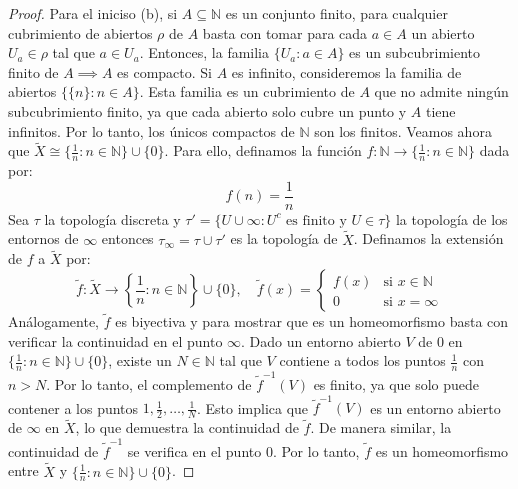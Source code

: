 \documentclass{article}
\theoremstyle{plain}
\theoremstyle{definition}
\newcommand{\N}{\mathbb{N}}
\begin{document}
\begin{proof}
    Para el iniciso (b), si \( A \subseteq \N \) es un conjunto finito, para cualquier cubrimiento de abiertos \( \rho \) de \( A \) basta con tomar
    para cada \( a \in A \) un abierto \( U_a \in \rho \) tal que \( a \in U_a \). Entonces, la familia \( \{ U_a : a \in A \} \) es un
    subcubrimiento finito de \( A \implies A \) es compacto. Si \( A \) es infinito, consideremos la familia de abiertos \( \{ \{ n \} : n \in A \} \).
    Esta familia es un cubrimiento de \( A \) que no admite ningún subcubrimiento finito, ya que cada abierto solo cubre un punto y \( A \) tiene infinitos.
    Por lo tanto, los únicos compactos de \( \N \) son los finitos. Veamos ahora que \( \tilde{X} \cong \{ \frac{1}{n} : n \in \N \} \cup \{ 0 \} \).
    Para ello, definamos la función \( f : \N \to \{ \frac{1}{n} : n \in \N \} \) dada por:\[
        f(n) = \frac{1}{n}
    \]
    Sea \( \tau \) la topología discreta y \( \tau' = \{ U \cup \infty : U^c \text{ es finito y } U \in \tau \} \) la topología de los entornos de \( \infty \)
    entonces \( \tau_\infty = \tau \cup \tau' \) es la topología de \( \tilde{X} \). Definamos la extensión de \( f \) a \( \tilde{X} \) por:
    \[
        \tilde{f} : \tilde{X} \longrightarrow \left \{ \frac{1}{n} : n \in \N \right \} \cup \{ 0 \}, \quad \tilde{f}(x) = \begin{cases}
            f(x) & \text{si } x \in \N   \\
            0    & \text{si } x = \infty
        \end{cases}
    \]
    Análogamente, \( \tilde{f} \) es biyectiva y para mostrar que es un homeomorfismo basta con verificar la continuidad en el punto \( \infty \).
    Dado un entorno abierto \( V \) de \( 0 \) en \( \{ \frac{1}{n} : n \in \N \} \cup \{ 0 \} \), existe un \( N \in \N \) tal que \( V \) contiene a todos los puntos \( \frac{1}{n} \) con \( n > N \).
    Por lo tanto, el complemento de \( \tilde{f}^{-1}(V) \) es finito, ya que solo puede contener a los puntos \( 1, \frac{1}{2}, \dots, \frac{1}{N} \).
    Esto implica que \( \tilde{f}^{-1}(V) \) es un entorno abierto de \( \infty \) en \( \tilde{X} \), lo que demuestra la continuidad de \( \tilde{f} \).
    De manera similar, la continuidad de \( \tilde{f}^{-1} \) se verifica en el punto \( 0 \). Por lo tanto, \( \tilde{f} \) es un homeomorfismo entre \( \tilde{X} \) y \( \{ \frac{1}{n} : n \in \N \} \cup \{ 0 \} \).


\end{proof}
\end{document}
